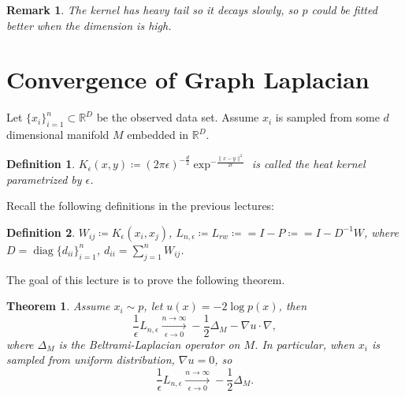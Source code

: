 \documentclass[11pt]{article}
\newcommand\<{\langle}
\newcommand\RR{\mathbb{R}}
\renewcommand\>{\rangle}
\newtheorem{theorem}{Theorem}
\newtheorem{definition}{Definition}
\newtheorem{remark}{Remark}
\begin{document}
\begin{remark}
The kernel has heavy tail so it decays slowly, so $p$ could be fitted better when the dimension is high.
\end{remark}





\section{Convergence of Graph Laplacian}
Let $\{x_i\}_{i=1}^n\subset \RR^D$ be the observed data set. Assume $x_i$ is sampled from some $d$ dimensional manifold $M$ embedded in $\RR^D$.
\begin{definition}
$K_\epsilon(x,y)\coloneqq (2\pi\epsilon)^{-\frac{d}{2}}\exp^{-\frac{\|x-y\|^2}{2\epsilon}}$ is called the heat kernel parametrized by $\epsilon$. 
\end{definition}
Recall the following definitions in the previous lectures:
\begin{definition}
$W_{ij}\coloneqq K_\epsilon(x_i,x_j)$, $L_{n,\epsilon}\coloneqq L_{rw}\coloneqq=I-P\coloneqq=I-D^{-1}W$, where $D=\operatorname{diag}\{d_{ii}\}_{i=1}^n$, $d_{ii}=\sum^n_{j=1}W_{ij}$.
\end{definition}
The goal of this lecture is to prove the following theorem.
\begin{theorem}
Assume $x_i\sim p$, let $u(x)=-2\log p(x)$, then
$$\frac{1}{\epsilon}L_{n,\epsilon}\xrightarrow[\text{$\epsilon\rightarrow 0$}]{\text{$n\rightarrow\infty$}}  -\frac{1}{2}\Delta_M-\nabla u\cdot\nabla,$$
where $\Delta_M$ is the Beltrami-Laplacian operator on $M$. In particular, when $x_i$ is sampled from uniform distribution, $\nabla u=0$, so 
$$\frac{1}{\epsilon}L_{n,\epsilon}\xrightarrow[\text{$\epsilon\rightarrow 0$}]{\text{$n\rightarrow\infty$}}  -\frac{1}{2}\Delta_M.$$
\end{theorem}
\end{document}
